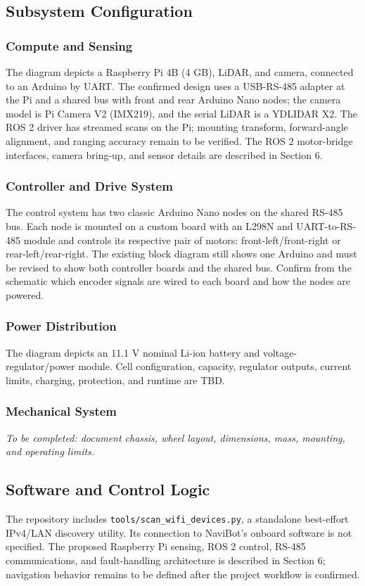 \subsection{Subsystem Configuration}
\subsubsection{Compute and Sensing}
The diagram depicts a Raspberry Pi 4B (4 GB), LiDAR, and camera, connected to an Arduino by UART. The confirmed design uses a USB-RS-485 adapter at the Pi and a shared bus with front and rear Arduino Nano nodes; the camera model is Pi Camera V2 (IMX219), and the serial LiDAR is a YDLIDAR X2. The ROS 2 driver has streamed scans on the Pi; mounting transform, forward-angle alignment, and ranging accuracy remain to be verified. The ROS 2 motor-bridge interfaces, camera bring-up, and sensor details are described in Section 6.

\subsubsection{Controller and Drive System}
The control system has two classic Arduino Nano nodes on the shared RS-485 bus. Each node is mounted on a custom board with an L298N and UART-to-RS-485 module and controls its respective pair of motors: front-left/front-right or rear-left/rear-right. The existing block diagram still shows one Arduino and must be revised to show both controller boards and the shared bus. Confirm from the schematic which encoder signals are wired to each board and how the nodes are powered.

\subsubsection{Power Distribution}
The diagram depicts an 11.1 V nominal Li-ion battery and voltage-regulator/power module. Cell configuration, capacity, regulator outputs, current limits, charging, protection, and runtime are TBD.

\subsubsection{Mechanical System}
\textit{To be completed: document chassis, wheel layout, dimensions, mass, mounting, and operating limits.}

\subsection{Software and Control Logic}
The repository includes \texttt{tools/scan\_wifi\_devices.py}, a standalone best-effort IPv4/LAN discovery utility. Its connection to NaviBot's onboard software is not specified. The proposed Raspberry Pi sensing, ROS 2 control, RS-485 communications, and fault-handling architecture is described in Section 6; navigation behavior remains to be defined after the project workflow is confirmed.

